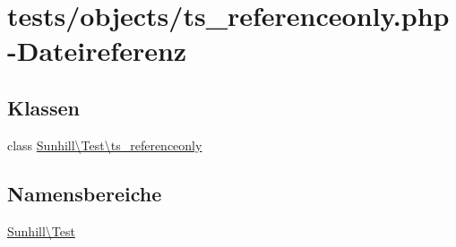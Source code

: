 \hypertarget{ts__referenceonly_8php}{}\section{tests/objects/ts\+\_\+referenceonly.php-\/\+Dateireferenz}
\label{ts__referenceonly_8php}
\subsection*{Klassen}
\begin{DoxyCompactItemize}
\item 
class \hyperlink{classSunhill_1_1Test_1_1ts__referenceonly}{Sunhill\textbackslash{}\+Test\textbackslash{}ts\+\_\+referenceonly}
\end{DoxyCompactItemize}
\subsection*{Namensbereiche}
\begin{DoxyCompactItemize}
\item 
 \hyperlink{namespaceSunhill_1_1Test}{Sunhill\textbackslash{}\+Test}
\end{DoxyCompactItemize}
